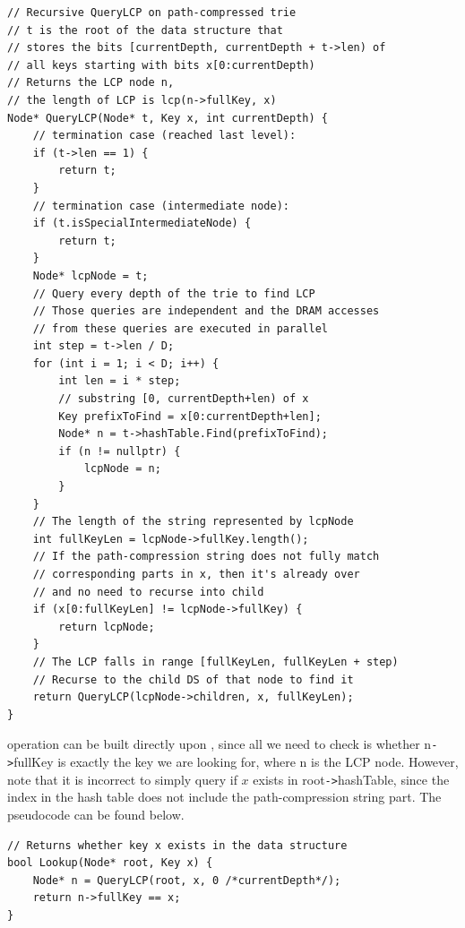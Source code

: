 \documentclass[11pt, usletter]{article}
\begin{document}
\singlespacing\begin{codebox}
\begin{verbatim}
// Recursive QueryLCP on path-compressed trie
// t is the root of the data structure that 
// stores the bits [currentDepth, currentDepth + t->len) of 
// all keys starting with bits x[0:currentDepth)
// Returns the LCP node n, 
// the length of LCP is lcp(n->fullKey, x)
Node* QueryLCP(Node* t, Key x, int currentDepth) {
    // termination case (reached last level):
    if (t->len == 1) {
        return t;
    }
    // termination case (intermediate node):
    if (t.isSpecialIntermediateNode) {
        return t;
    }
    Node* lcpNode = t;
    // Query every depth of the trie to find LCP
    // Those queries are independent and the DRAM accesses 
    // from these queries are executed in parallel
    int step = t->len / D;
    for (int i = 1; i < D; i++) {
        int len = i * step;
        // substring [0, currentDepth+len) of x
        Key prefixToFind = x[0:currentDepth+len];
        Node* n = t->hashTable.Find(prefixToFind);
        if (n != nullptr) {
            lcpNode = n;
        } 
    }
    // The length of the string represented by lcpNode
    int fullKeyLen = lcpNode->fullKey.length();
    // If the path-compression string does not fully match 
    // corresponding parts in x, then it's already over
    // and no need to recurse into child
    if (x[0:fullKeyLen] != lcpNode->fullKey) {
        return lcpNode;
    }
    // The LCP falls in range [fullKeyLen, fullKeyLen + step)
    // Recurse to the child DS of that node to find it
    return QueryLCP(lcpNode->children, x, fullKeyLen);
}
\end{verbatim}
\end{codebox}\doublespacing

\lookup operation can be built directly upon \QueryLCP, 
since all we need to check is whether n\verb|->|fullKey is exactly the key we are looking for, 
where n is the LCP node.
However, note that it is incorrect to simply query if $x$ exists in root\verb|->|hashTable, 
since the index in the hash table does not include the path-compression string part.
The pseudocode can be found below.

\singlespacing\begin{codebox}
\begin{verbatim}
// Returns whether key x exists in the data structure
bool Lookup(Node* root, Key x) {
    Node* n = QueryLCP(root, x, 0 /*currentDepth*/);
    return n->fullKey == x;
}
\end{verbatim}
\end{codebox}\doublespacing
\end{document}
